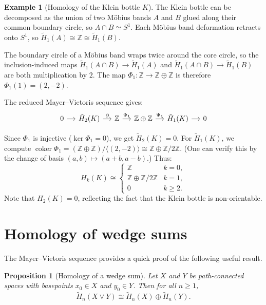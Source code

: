 \documentclass[12pt,a4paper,openany]{book}
\theoremstyle{definition}
\newtheorem{example}[definition]{Example}
\theoremstyle{plain}
\newtheorem{proposition}[definition]{Proposition}
\theoremstyle{remark}
\newcommand{\Z}{\mathbb{Z}}
\DeclareMathOperator{\coker}{coker}
\begin{document}
\begin{example}[Homology of the Klein bottle $K$]
The Klein bottle can be decomposed as the union of two M\"obius
bands $A$ and $B$ glued along their common boundary circle, so
$A\cap B\simeq S^1$. Each M\"obius band deformation retracts onto
$S^1$, so $\tilde{H}_1(A)\cong\Z\cong\tilde{H}_1(B)$.

The boundary circle of a M\"obius band wraps twice around the core
circle, so the inclusion-induced maps
$\tilde{H}_1(A\cap B)\to\tilde{H}_1(A)$ and
$\tilde{H}_1(A\cap B)\to\tilde{H}_1(B)$ are both multiplication by
$2$. The map $\Phi_1\colon\Z\to\Z\oplus\Z$ is therefore
$\Phi_1(1)=(2,-2)$.

The reduced Mayer--Vietoris sequence gives:
\[
\begin{tikzcd}[column sep=small]
0 \ar[r]
  & \tilde{H}_2(K) \ar[r,"\partial"]
  & \Z \ar[r,"{\Phi_1}"]
  & \Z\oplus\Z \ar[r,"\Psi_1"]
  & \tilde{H}_1(K) \ar[r]
  & 0
\end{tikzcd}
\]

Since $\Phi_1$ is injective ($\ker\Phi_1=0$), we get
$\tilde{H}_2(K)=0$. For $\tilde{H}_1(K)$, we compute
$\coker\Phi_1 = (\Z\oplus\Z)/\langle(2,-2)\rangle \cong \Z\oplus\Z/2\Z$.
(One can verify this by the change of basis $(a,b)\mapsto(a+b,a-b)$.)
Thus:
\[
  H_k(K) \cong
  \begin{cases}
    \Z           & k=0,\\
    \Z\oplus\Z/2\Z & k=1,\\
    0            & k\geq 2.
  \end{cases}
\]
Note that $H_2(K)=0$, reflecting the fact that the Klein bottle is
non-orientable.
\end{example}

\section{Homology of wedge sums}
\label{sec:mv-wedge}

The Mayer--Vietoris sequence provides a quick proof of the following
useful result.

\begin{proposition}[Homology of a wedge sum]\label{prop:homology-wedge}
Let $X$ and $Y$ be path-connected spaces with basepoints $x_0\in X$
and $y_0\in Y$. Then for all $n\geq 1$,
\[
  \tilde{H}_n(X\vee Y) \cong \tilde{H}_n(X)\oplus\tilde{H}_n(Y).
\]
\end{proposition}
\end{document}
